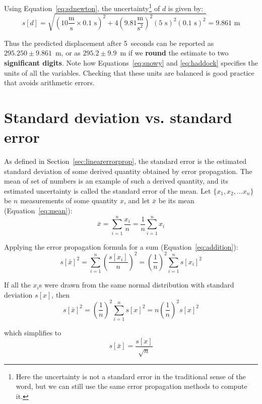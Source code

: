 \begin{enumerate}
  Using Equation~\ref{eq:sdnewton}, the uncertainty\footnote{Here the
    uncertainty is not a standard error in the traditional sense of
    the word, but we can still use the same error propagation methods
    to compute it.} of $d$ is given by:
  \begin{equation}
  s[d] = \sqrt{\left(10 \frac{\mbox{m}}{\mbox{s}} \times
    0.1\mbox{~s}\right)^2 + 4
    \left(9.81\frac{\mbox{m}}{\mbox{s}^2}\right)^2
    \left(5\mbox{~s}\right)^2\left(0.1\mbox{~s}\right)^2} =
  9.861\mbox{~m}
  \label{eq:haddock}
  \end{equation}

  Thus the predicted displacement after 5~seconds can be reported as
  $295.250\pm{9.861}$~m, or as $295.2\pm{9.9}$~m if we \textbf{round}
  the estimate to two \textbf{significant digits}. Note how
  Equations~\ref{eq:snowy} and \ref{eq:haddock} specifies the units of
  all the variables. Checking that these units are balanced is good
  practice that avoids arithmetic errors.
  
\end{enumerate}

\section{Standard deviation vs. standard error}
\label{sec:stderr}

As defined in Section~\ref{sec:linearerrorprop}, the standard error is
the estimated standard deviation of some derived quantity obtained by
error propagation. The mean of set of numbers is an example of such a
derived quantity, and its estimated uncertainty is called the standard
error of the mean.  Let $\{x_1,x_2, \ldots x_n\}$ be $n$ measurements
of some quantity $x$, and let $\bar{x}$ be its mean
(Equation~\ref{eq:mean}):
\[
\bar{x} = \sum\limits_{i=1}^n \frac{x_i}{n} = \frac{1}{n} \sum\limits_{i=1}^n x_i
\]

Applying the error propagation formula for a sum
(Equation~\ref{eq:addition}):
\[
s[\bar{x}]^2 = \sum\limits_{i=1}^{n}\left(\frac{s[x_i]}{n}\right)^2 =
\left(\frac{1}{n}\right)^2 \sum\limits_{i=1}^{n}s[x_i]^2
\]

If all the $x_i$s were drawn from the same normal distribution with
standard deviation $s[x]$, then
\[
s[\bar{x}]^2 = \left(\frac{1}{n}\right)^2 \sum\limits_{i=1}^{n}s[x]^2 =
n \left(\frac{1}{n}\right)^2 s[x]^2
\]

\noindent which simplifies to
\begin{equation}
  s[\bar{x}] = \frac{s[x]}{\sqrt{n}}
  \label{eq:stderrmean}
\end{equation}

